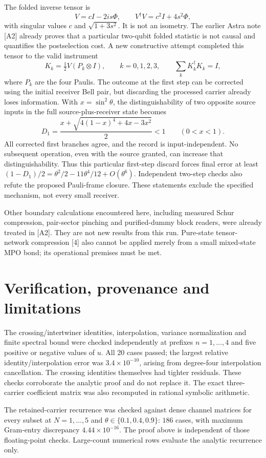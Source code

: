 \documentclass[11pt,a4paper]{article}
\begin{document}
The folded inverse tensor is
\[
 V=cI-2is\Phi,\qquad V^\dagger V=c^2I+4s^2\Phi,
\]
with singular values $c$ and $\sqrt{1+3s^2}$. It is not an isometry. The earlier Astra note [A2] already proves that a particular two-qubit folded statistic is not causal and quantifies the postselection cost. A new constructive attempt completed this tensor to the valid instrument
\[
 K_k=\tfrac12V(P_k\otimes I),\qquad k=0,1,2,3,
 \qquad\sum_kK_k^\dagger K_k=I,
\]
where $P_k$ are the four Paulis. The outcome at the first step can be corrected using the initial receiver Bell pair, but discarding the processed carrier already loses information. With $x=\sin^2\theta$, the distinguishability of two opposite source inputs in the full source-plus-receiver state becomes
\[
 D_1=\frac{x+\sqrt{4(1-x)^4+4x-3x^2}}2<1\qquad(0<x<1).
\]
All corrected first branches agree, and the record is input-independent. No subsequent operation, even with the source granted, can increase that distinguishability. Thus this particular first-step discard forces final error at least $(1-D_1)/2=\theta^2/2-11\theta^4/12+O(\theta^6)$. Independent two-step checks also refute the proposed Pauli-frame closure. These statements exclude the specified mechanism, not every small receiver.

Other boundary calculations encountered here, including measured Schur compression, pair-sector pinching and purified-dummy block readers, were already treated in [A2]. They are not new results from this run. Pure-state tensor-network compression [4] also cannot be applied merely from a small mixed-state MPO bond; its operational premises must be met.

\section{Verification, provenance and limitations}
The crossing/intertwiner identities, interpolation, variance normalization and finite spectral bound were checked independently at prefixes $n=1,\ldots,4$ and five positive or negative values of $u$. All 20 cases passed; the largest relative identity/interpolation error was $3.4\times10^{-10}$, arising from degree-four interpolation cancellation. The crossing identities themselves had tighter residuals. These checks corroborate the analytic proof and do not replace it. The exact three-carrier coefficient matrix was also recomputed in rational symbolic arithmetic.

The retained-carrier recurrence was checked against dense channel matrices for every subset at $N=1,\ldots,5$ and $\theta\in\{0.1,0.4,0.9\}$: $186$ cases, with maximum Gram-entry discrepancy $4.44\times10^{-16}$. The proof above is independent of those floating-point checks. Large-count numerical rows evaluate the analytic recurrence only.
\end{document}

